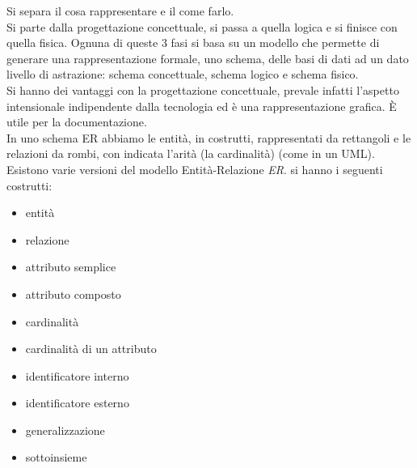 \documentclass[a4paper,12pt, oneside]{book}
\begin{document}
Si separa il cosa rappresentare e il come farlo.\\
Si parte dalla progettazione concettuale, si passa a quella logica e si finisce con quella fisica.
Ognuna di queste 3 fasi si basa su un modello che permette di generare una rappresentazione formale, uno schema, delle basi di dati ad un dato livello di astrazione: schema concettuale, schema logico e schema fisico. 
\\
Si hanno dei vantaggi con la progettazione concettuale, prevale infatti l'aspetto intensionale indipendente dalla tecnologia ed è una rappresentazione grafica. È utile per la documentazione.\\
In uno schema ER abbiamo le entità, in costrutti,  rappresentati da rettangoli e le relazioni da rombi, con indicata l'arità (la cardinalità) (come in un UML). Esistono varie versioni del modello Entità-Relazione \textit{ER}.
si hanno i seguenti costrutti:
\begin{itemize}
\item entità
\item relazione
\item attributo semplice
\item attributo composto
\item cardinalità
\item cardinalità di un attributo
\item identificatore interno
\item identificatore esterno
\item generalizzazione
\item sottoinsieme
\end{itemize}
\end{document}
